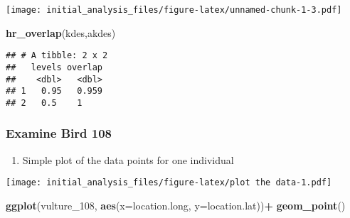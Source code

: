 \documentclass[
]{article}
\newenvironment{Shaded}{\begin{snugshade}}{\end{snugshade}}
\newcommand{\AttributeTok}[1]{\textcolor[rgb]{0.13,0.29,0.53}{#1}}
\newcommand{\CommentTok}[1]{\textcolor[rgb]{0.56,0.35,0.01}{\textit{#1}}}
\newcommand{\DecValTok}[1]{\textcolor[rgb]{0.00,0.00,0.81}{#1}}
\newcommand{\FunctionTok}[1]{\textcolor[rgb]{0.13,0.29,0.53}{\textbf{#1}}}
\newcommand{\NormalTok}[1]{#1}
\newcommand{\OtherTok}[1]{\textcolor[rgb]{0.56,0.35,0.01}{#1}}
\newcommand{\SpecialCharTok}[1]{\textcolor[rgb]{0.81,0.36,0.00}{\textbf{#1}}}
\providecommand{\tightlist}{%
  \setlength{\itemsep}{0pt}\setlength{\parskip}{0pt}}
\begin{document}
\texttt{[image: initial\_analysis\_files/figure-latex/unnamed-chunk-1-3.pdf]}

\begin{Shaded}
\begin{Highlighting}[]
\FunctionTok{hr\_overlap}\NormalTok{(kdes,akdes)}
\end{Highlighting}
\end{Shaded}

\begin{verbatim}
## # A tibble: 2 x 2
##   levels overlap
##    <dbl>   <dbl>
## 1   0.95   0.959
## 2   0.5    1
\end{verbatim}

\hypertarget{examine-bird-108}{%
\subsubsection{Examine Bird 108}\label{examine-bird-108}}

\begin{enumerate}
\def\labelenumi{\alph{enumi}.}
\setcounter{enumi}{4}
\tightlist
\item
  Simple plot of the data points for one individual
\end{enumerate}

\begin{Shaded}
\end{Shaded}

\texttt{[image: initial\_analysis\_files/figure-latex/plot the data-1.pdf]}

\begin{Shaded}
\begin{Highlighting}[]
\FunctionTok{ggplot}\NormalTok{(vulture\_108, }\FunctionTok{aes}\NormalTok{(}\AttributeTok{x=}\NormalTok{location.long, }\AttributeTok{y=}\NormalTok{location.lat))}\SpecialCharTok{+} \FunctionTok{geom\_point}\NormalTok{()}
\end{Highlighting}
\end{Shaded}
\end{document}
